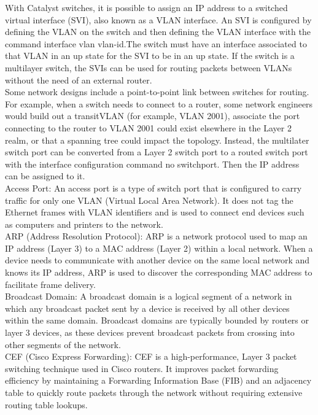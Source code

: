 \documentclass{article}
\begin{document}
	With Catalyst switches, it is possible to assign an IP address to a switched virtual interface (SVI), also known as a VLAN interface. An SVI is configured by defining the VLAN on the switch and then defining the VLAN interface with the command interface vlan vlan-id.The switch must have an interface associated to that VLAN in an up state for the SVI to be in an up state. If the switch is a multilayer switch, the SVIs can be used for routing packets between VLANs without the need of an external router.\\

	Some network designs include a point-to-point link between switches for routing. For example, when a switch needs to connect to a router, some network engineers would build out a transitVLAN (for example, VLAN 2001), associate the port connecting to the router to VLAN 2001 could exist elsewhere in the Layer 2 realm, or that a spanning tree could impact the topology. Instead, the multilater switch port can be converted from a Layer 2 switch port to a routed switch port with the interface configuration command no switchport. Then the IP address can be assigned to it.\\

Access Port: An access port is a type of switch port that is configured to carry traffic for only one VLAN (Virtual Local Area Network). It does not tag the Ethernet frames with VLAN identifiers and is used to connect end devices such as computers and printers to the network.\\

ARP (Address Resolution Protocol): ARP is a network protocol used to map an IP address (Layer 3) to a MAC address (Layer 2) within a local network. When a device needs to communicate with another device on the same local network and knows its IP address, ARP is used to discover the corresponding MAC address to facilitate frame delivery.\\

Broadcast Domain: A broadcast domain is a logical segment of a network in which any broadcast packet sent by a device is received by all other devices within the same domain. Broadcast domains are typically bounded by routers or layer 3 devices, as these devices prevent broadcast packets from crossing into other segments of the network.\\

CEF (Cisco Express Forwarding): CEF is a high-performance, Layer 3 packet switching technique used in Cisco routers. It improves packet forwarding efficiency by maintaining a Forwarding Information Base (FIB) and an adjacency table to quickly route packets through the network without requiring extensive routing table lookups.\\
\end{document}
